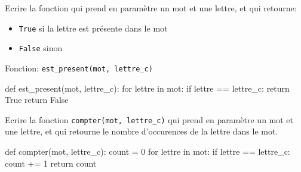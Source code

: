 \documentclass[11pt, a4paper]{report}
\begin{document}
    
    \begin{minipage}{0.48\linewidth}
        \begin{exercice_cours}

Ecrire la fonction  qui prend en paramètre un mot et une lettre, et qui retourne: 
\begin{itemize}
        \item \texttt{True} si la lettre est présente dans le mot
        \item \texttt{False} sinon 
    \end{itemize}

    Fonction: \verb|est_present(mot, lettre_c)|
    \end{exercice_cours}

    \end{minipage}\hfill
    \begin{minipage}{0.48\linewidth}
\begin{blocvisible}[height=4.5]
    \begin{CodePythontexAlt}[TaillePolice=\large, Largeur=1\linewidth,Centre,Lignes=true,PremLigne=1]{}
def est_present(mot, lettre_c):
    for lettre in mot:
        if lettre == lettre_c:
            return True
    return False
    \end{CodePythontexAlt}
\end{blocvisible}


    \end{minipage}

        
    \begin{minipage}{0.48\linewidth}
           \begin{exercice_cours}

            Ecrire la fonction \verb|compter(mot, lettre_c)| qui prend en paramètre un mot et une lettre, et qui retourne le nombre d'occurences de la lettre dans le mot.
    \end{exercice_cours}

    \end{minipage}\hfill
    \begin{minipage}{0.48\linewidth}
\begin{blocvisible}[height=4.5]
    \begin{CodePythontexAlt}[TaillePolice=\large, Largeur=1\linewidth,Centre,Lignes=true,PremLigne=1]{}
def compter(mot, lettre_c):
    count = 0
    for lettre in mot:
        if lettre == lettre_c:
            count += 1
    return count
    \end{CodePythontexAlt}
\end{blocvisible}

    \end{minipage}
\end{document}
